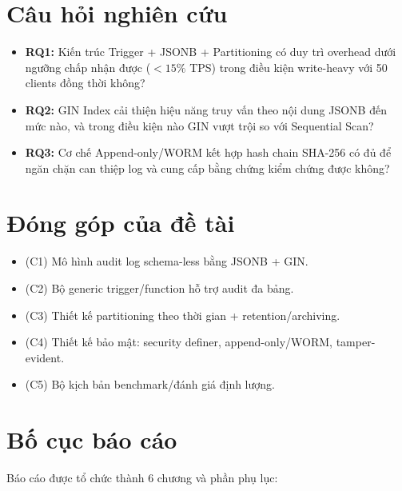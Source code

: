 \section{Câu hỏi nghiên cứu}

\begin{itemize}
    \item \textbf{RQ1:} Kiến trúc Trigger + JSONB + Partitioning có duy trì overhead dưới ngưỡng chấp nhận được ($< 15\%$ TPS) trong điều kiện write-heavy với 50 clients đồng thời không?
    \item \textbf{RQ2:} GIN Index cải thiện hiệu năng truy vấn theo nội dung JSONB đến mức nào, và trong điều kiện nào GIN vượt trội so với Sequential Scan?
    \item \textbf{RQ3:} Cơ chế Append-only/WORM kết hợp hash chain SHA-256 có đủ để ngăn chặn can thiệp log và cung cấp bằng chứng kiểm chứng được không?
\end{itemize}

\section{Đóng góp của đề tài}

\begin{itemize}
    \item (C1) Mô hình audit log schema-less bằng JSONB + GIN.
    \item (C2) Bộ generic trigger/function hỗ trợ audit đa bảng.
    \item (C3) Thiết kế partitioning theo thời gian + retention/archiving.
    \item (C4) Thiết kế bảo mật: security definer, append-only/WORM, tamper-evident.
    \item (C5) Bộ kịch bản benchmark/đánh giá định lượng.
\end{itemize}

\section{Bố cục báo cáo}

Báo cáo được tổ chức thành 6 chương và phần phụ lục:

